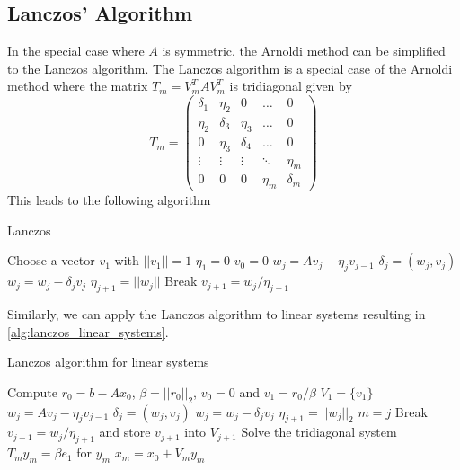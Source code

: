 \subsection{Lanczos' Algorithm}
In the special case where $A$ is symmetric, the Arnoldi method can be simplified to the Lanczos algorithm. The Lanczos algorithm is a special case of the Arnoldi method where the matrix $T_m = V^T_mAV^T_m$ is tridiagonal given by
\begin{equation}
  T_m =
  \begin{pmatrix}
    \delta_1 & \eta_2   & 0        & \dots  & 0        \\
    \eta_2   & \delta_3 & \eta_3   & \dots  & 0        \\
    0        & \eta_3   & \delta_4 & \dots  & 0        \\
    \vdots   & \vdots   & \vdots   & \ddots & \eta_m   \\
    0        & 0        & 0        & \eta_m & \delta_m
  \end{pmatrix}
  \label{eq:lanczos_tridiagonal}
\end{equation}
This leads to the following algorithm
\begin{algorithm}[H]
  \caption{Lanczos \cite[algorithm 6.15]{iter_method_saad}}
  \begin{algorithmic}
    \State Choose a vector $v_1$ with $||v_1|| = 1$
    \State $\eta_1 = 0$
    \State $v_0 = 0$
    \State $w_j = Av_j - \eta_j v_{j-1}$
    \State $\delta_j = (w_j, v_j)$
    \State $w_j = w_j - \delta_j v_j$
    \State $\eta_{j+1} = ||w_j||$
    \State Break
    \EndIf
    \State $v_{j+1} = w_j / \eta_{j+1}$
    \EndFor
  \end{algorithmic}
\end{algorithm}
Similarly, we can apply the Lanczos algorithm to linear systems resulting in \cref{alg:lanczos_linear_systems}.
\begin{algorithm}
  \caption{Lanczos algorithm for linear systems \cite[Algorithm 6.16]{iter_method_saad}}
  \begin{algorithmic}
    \State Compute $r_0 = b - Ax_0$, $\beta = ||r_0||_2$, $v_0 = 0$ and $v_1 = r_0 / \beta$
    \State $V_{1} = \{v_1\}$
    \State $w_j = Av_j - \eta_j v_{j-1}$
    \State $\delta_j = (w_j, v_j)$
    \State $w_j = w_j - \delta_j v_j$
    \State $\eta_{j+1} = ||w_j||_2$
    \State $m = j$
    \State Break
    \EndIf
    \State $v_{j+1} = w_j / \eta_{j+1}$ and store $v_{j+1}$ into $V_{j+1}$
    \EndFor
    \State Solve the tridiagonal system $T_m y_m = \beta e_1$ for $y_m$
    \State $x_m = x_0 + V_m y_m$
  \end{algorithmic}
  \label{alg:lanczos_linear_systems}
\end{algorithm}

